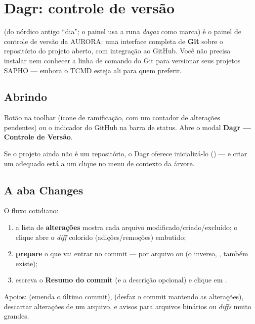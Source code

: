 \chapter{Dagr: controle de versão}
\label{cap:git}

 (do nórdico antigo \enquote{dia}; o painel usa a runa \emph{dagaz} como marca) é o painel de controle de versão da AURORA: uma interface completa de \textbf{Git} sobre o repositório do projeto aberto, com integração ao GitHub. Você não precisa instalar nem conhecer a linha de comando do Git para versionar seus projetos SAPHO --- embora o TCMD esteja ali para quem preferir.

\section{Abrindo}

Botão  na toolbar (ícone de ramificação, com um contador de alterações pendentes) ou o indicador do GitHub na barra de status. Abre o modal \textbf{Dagr --- Controle de Versão}.


Se o projeto ainda não é um repositório, o Dagr oferece inicializá-lo () --- e criar um  adequado está a um clique no menu de contexto da árvore.

\section{A aba Changes}

O fluxo cotidiano:

\begin{enumerate}
  \item a lista de \textbf{alterações} mostra cada arquivo modificado/criado/excluído; o clique abre o \emph{diff} colorido (adições/remoções) embutido;
  \item \textbf{prepare} o que vai entrar no commit --- por arquivo ou  (o inverso, , também existe);
  \item escreva o \textbf{Resumo do commit} (e a descrição opcional) e clique em .
\end{enumerate}

Apoios:  (emenda o último commit),  (desfaz o commit mantendo as alterações), descartar alterações de um arquivo, e avisos para arquivos binários ou \emph{diffs} muito grandes.

